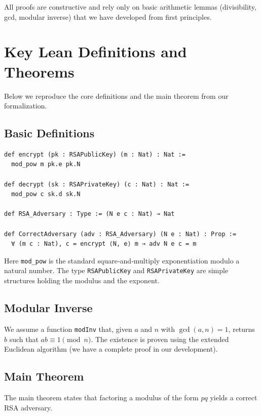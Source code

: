 \documentclass[12pt,a4paper]{article}
\begin{document}
All proofs are constructive and rely only on basic arithmetic lemmas (divisibility, gcd, modular inverse) that we have developed from first principles.

\section{Key Lean Definitions and Theorems}

Below we reproduce the core definitions and the main theorem from our formalization.

\subsection{Basic Definitions}

\begin{lstlisting}[style=lean]
def encrypt (pk : RSAPublicKey) (m : Nat) : Nat :=
  mod_pow m pk.e pk.N

def decrypt (sk : RSAPrivateKey) (c : Nat) : Nat :=
  mod_pow c sk.d sk.N

def RSA_Adversary : Type := (N e c : Nat) → Nat

def CorrectAdversary (adv : RSA_Adversary) (N e : Nat) : Prop :=
  ∀ (m c : Nat), c = encrypt ⟨N, e⟩ m → adv N e c = m
\end{lstlisting}

Here \texttt{mod\_pow} is the standard square‐and‐multiply exponentiation modulo a natural number. The type \texttt{RSAPublicKey} and \texttt{RSAPrivateKey} are simple structures holding the modulus and the exponent.

\subsection{Modular Inverse}

We assume a function \texttt{modInv} that, given \(a\) and \(n\) with \(\gcd(a,n)=1\), returns \(b\) such that \(a b \equiv 1 \pmod n\). The existence is proven using the extended Euclidean algorithm (we have a complete proof in our development).

\subsection{Main Theorem}

The main theorem states that factoring a modulus of the form \(p q\) yields a correct RSA adversary.
\end{document}
